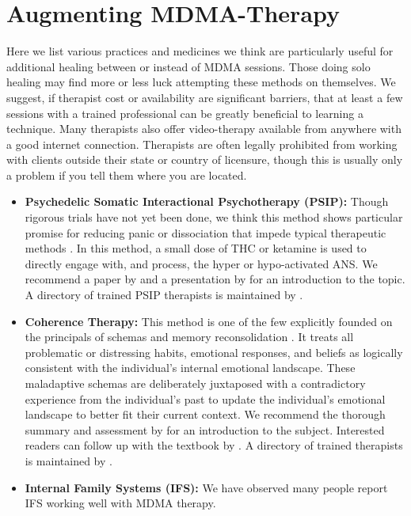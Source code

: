 \documentclass[12pt,letterpaper]{article}
\begin{document}
\section{Augmenting MDMA-Therapy}
\label{healingPractices}
Here we list various practices and medicines we think are particularly useful for additional healing between or instead of MDMA sessions. Those doing solo healing may find more or less luck attempting these methods on themselves. We suggest, if therapist cost or availability are significant barriers, that at least a few sessions with a trained professional can be greatly beneficial to learning a technique. Many therapists also offer video-therapy available from anywhere with a good internet connection. Therapists are often legally prohibited from working with clients outside their state or country of licensure, though this is usually only a problem if you tell them where you are located.
\begin{itemize}
    \item \textbf{Psychedelic Somatic Interactional Psychotherapy (PSIP):} Though rigorous trials have not yet been done, we think this method shows particular promise for reducing panic or dissociation that impede typical therapeutic methods \cite{razviPSIP,ragnhildstveit2023cannabis}. In this method, a small dose of THC or ketamine is used to directly engage with, and process, the hyper or hypo-activated ANS. We recommend a paper by \textcite{razviPSIP} and a presentation by \textcite{razviPresentation} for an introduction to the topic. A directory of trained PSIP therapists is maintained by \textcite{psipDirectory}.
    \item \textbf{Coherence Therapy:} This method is one of the few explicitly founded on the principals of schemas and memory reconsolidation \cite{eckerUnlocking}. It treats all problematic or distressing habits, emotional responses, and beliefs as logically consistent with the individual's internal emotional landscape. These maladaptive schemas are deliberately juxtaposed with a contradictory experience from the individual's past to update the individual's emotional landscape to better fit their current context. We recommend the thorough summary and assessment by \textcite{lesswrongCoherenceTherapy} for an introduction to the subject. Interested readers can follow up with the textbook by \textcite{eckerUnlocking}. A directory of trained therapists is maintained by \textcite{coherenceDirectory}.
    \item \textbf{Internal Family Systems (IFS):} We have observed many people report IFS working well with MDMA therapy. 
\end{itemize}
\end{document}
